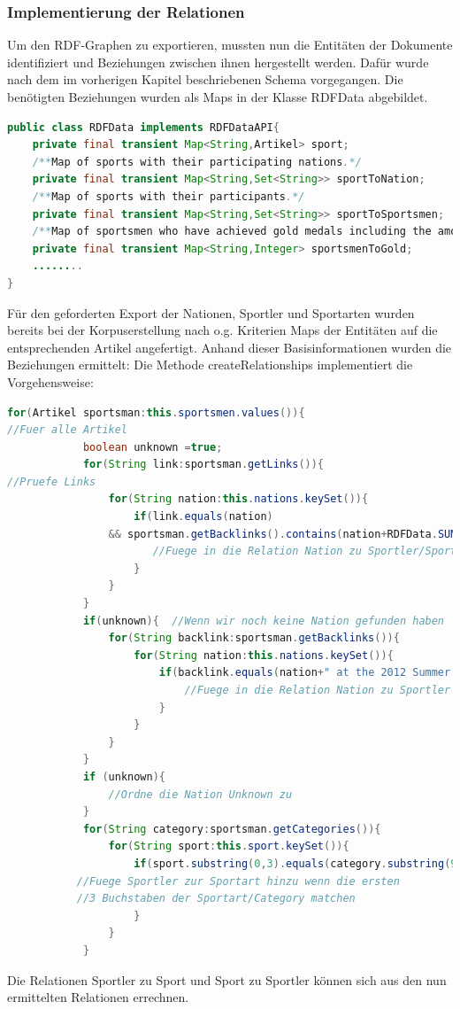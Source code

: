 \documentclass[pagesize=auto, titlepage=on]{scrartcl}
\begin{document}
\subsubsection{Implementierung der Relationen}
Um den RDF-Graphen zu exportieren, mussten nun die Entitäten der Dokumente identifiziert und Beziehungen zwischen ihnen hergestellt werden. Dafür wurde nach dem im vorherigen Kapitel beschriebenen Schema vorgegangen.
Die benötigten Beziehungen wurden als Maps in der Klasse RDFData abgebildet.
\begin{lstlisting}[language=Java]
public class RDFData implements RDFDataAPI{
	private final transient Map<String,Artikel> sport;
	/**Map of sports with their participating nations.*/
	private final transient Map<String,Set<String>> sportToNation;
	/**Map of sports with their participants.*/
	private final transient Map<String,Set<String>> sportToSportsmen;
	/**Map of sportsmen who have achieved gold medals including the amount.*/
	private final transient Map<String,Integer> sportsmenToGold;
	........
}\end{lstlisting}
Für den geforderten Export der Nationen, Sportler und Sportarten wurden bereits bei der Korpuserstellung nach o.g. Kriterien Maps der Entitäten auf die entsprechenden Artikel angefertigt.
Anhand dieser Basisinformationen wurden die Beziehungen ermittelt:
Die Methode createRelationships implementiert die Vorgehensweise:
\begin{lstlisting}[language=Java]
for(Artikel sportsman:this.sportsmen.values()){
//Fuer alle Artikel
	        boolean unknown =true;
	        for(String link:sportsman.getLinks()){
//Pruefe Links	        	
	        	for(String nation:this.nations.keySet()){
	        		if(link.equals(nation) 
	        	&& sportsman.getBacklinks().contains(nation+RDFData.SUMMEROLYMPICS)){
		               //Fuege in die Relation Nation zu Sportler/Sportler zu Nation ein
	        		}
	        	}
	        }
	        if(unknown){  //Wenn wir noch keine Nation gefunden haben
	        	for(String backlink:sportsman.getBacklinks()){
	        		for(String nation:this.nations.keySet()){
	        			if(backlink.equals(nation+" at the 2012 Summer Olympics")){
	        				//Fuege in die Relation Nation zu Sportler hinzu
	        			}
	        		}
	        	}
	        }
	        if (unknown){
	            //Ordne die Nation Unknown zu
	        }
	        for(String category:sportsman.getCategories()){
	            for(String sport:this.sport.keySet()){
	                if(sport.substring(0,3).equals(category.substring(9,12))){
	       //Fuege Sportler zur Sportart hinzu wenn die ersten 
	       //3 Buchstaben der Sportart/Category matchen
	                }
	            }
	        }
\end{lstlisting}
Die Relationen Sportler zu Sport und Sport zu Sportler können sich aus den nun ermittelten Relationen errechnen.
\end{document}
